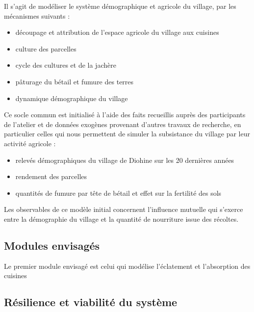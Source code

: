 Il s'agit de modéliser le système démographique et agricole du village, par les mécanismes suivants  : 
\begin{itemize}
\item découpage et attribution de l'espace agricole du village aux cuisines 
\item culture des parcelles
\item cycle des cultures et de la jachère
\item pâturage du bétail et fumure des terres
\item dynamique démographique du village
\end{itemize} 


Ce socle commun est initialisé à l'aide des faits recueillis auprès des participants de l'atelier  et de données  exogènes provenant d'autres travaux de recherche, en particulier celles qui nous permettent de simuler la subsistance du village par leur activité agricole :


\begin{itemize}
\item relevés démographiques du village de Diohine sur les 20 dernières années
\item rendement des parcelles 
\item quantités de fumure par tête de bétail et effet sur la fertilité des sols
\end{itemize}


Les observables de ce modèle initial concernent l'influence mutuelle qui s'exerce entre la démographie du village et la quantité de nourriture issue des récoltes. 

\subsection{Modules envisagés }

Le premier module envisagé est celui qui modélise l'éclatement et l'absorption des cuisines



\subsection{Résilience et viabilité du système}

